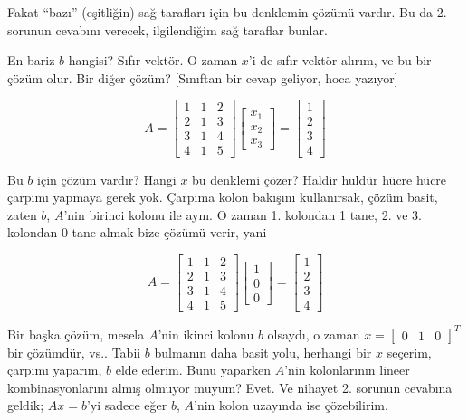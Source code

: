 \documentclass[12pt,fleqn]{article}\usepackage{../../common}
\begin{document}
Fakat ``bazı'' (eşitliğin) sağ tarafları için bu denklemin çözümü
vardır. Bu da 2. sorunun cevabını verecek, ilgilendiğim sağ taraflar
bunlar. 

En bariz $b$ hangisi? Sıfır vektör. O zaman $x$'i de sıfır vektör alırım,
ve bu bir çözüm olur. Bir diğer çözüm? [Sınıftan bir cevap geliyor, hoca
yazıyor]


$$ A = 
\left[\begin{array}{rrr}
1 & 1 & 2 \\
2 & 1 & 3 \\
3 & 1 & 4 \\
4 & 1 & 5 
\end{array}\right]
\left[\begin{array}{r}
x_1  \\
x_2  \\
x_3  
\end{array}\right] 
=
\left[\begin{array}{r}
1  \\
2  \\
3  \\
4  
\end{array}\right]
 $$

Bu $b$ için çözüm vardır? Hangi $x$ bu denklemi çözer? Haldir huldür hücre
hücre çarpımı yapmaya gerek yok. Çarpıma kolon bakışını kullanırsak, çözüm
basit, zaten $b$, $A$'nin birinci kolonu ile aynı. O zaman 1. kolondan 1
tane, 2. ve 3. kolondan 0 tane almak bize çözümü verir, yani

$$ A = 
\left[\begin{array}{rrr}
1 & 1 & 2 \\
2 & 1 & 3 \\
3 & 1 & 4 \\
4 & 1 & 5 
\end{array}\right]
\left[\begin{array}{r}
1  \\
0  \\
0  
\end{array}\right] 
=
\left[\begin{array}{r}
1  \\
2  \\
3  \\
4  
\end{array}\right]
$$


Bir başka çözüm, mesela $A$'nin ikinci kolonu $b$ olsaydı, o zaman 
$x = \left[\begin{array}{rrr} 0 & 1 & 0 \end{array}\right]^T$ bir çözümdür,
vs.. Tabii $b$ bulmanın daha basit yolu, herhangi bir $x$ seçerim, çarpımı
yaparım, $b$ elde ederim. Bunu yaparken $A$'nin kolonlarının lineer
kombinasyonlarını almış olmuyor muyum? Evet. Ve nihayet 2. sorunun cevabına 
geldik; $Ax=b$'yi sadece eğer $b$, $A$'nin kolon uzayında ise çözebilirim. 
\end{document}
